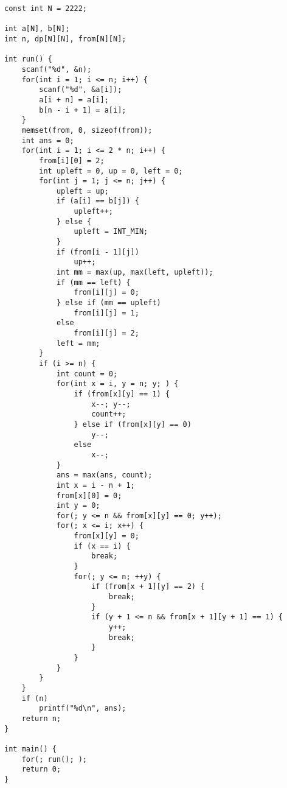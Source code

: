\begin{lstlisting}
const int N = 2222;

int a[N], b[N];
int n, dp[N][N], from[N][N];

int run() {
	scanf("%d", &n);
	for(int i = 1; i <= n; i++) {
		scanf("%d", &a[i]);
		a[i + n] = a[i];
		b[n - i + 1] = a[i];
	}
	memset(from, 0, sizeof(from));
	int ans = 0;
	for(int i = 1; i <= 2 * n; i++) {
		from[i][0] = 2;
		int upleft = 0, up = 0, left = 0;
		for(int j = 1; j <= n; j++) {
			upleft = up;
			if (a[i] == b[j]) {
				upleft++;
			} else {
				upleft = INT_MIN;
			}
			if (from[i - 1][j])
				up++;
			int mm = max(up, max(left, upleft));
			if (mm == left) {
				from[i][j] = 0;
			} else if (mm == upleft)
				from[i][j] = 1;
			else
				from[i][j] = 2;
			left = mm;
		}
		if (i >= n) {
			int count = 0;
			for(int x = i, y = n; y; ) {
				if (from[x][y] == 1) {
					x--; y--;
					count++;
				} else if (from[x][y] == 0)
					y--;
				else
					x--;
			}
			ans = max(ans, count);
			int x = i - n + 1;
			from[x][0] = 0;
			int y = 0;
			for(; y <= n && from[x][y] == 0; y++);
			for(; x <= i; x++) {
				from[x][y] = 0;
				if (x == i) {
					break;
				}
				for(; y <= n; ++y) {
					if (from[x + 1][y] == 2) {
						break;
					}
					if (y + 1 <= n && from[x + 1][y + 1] == 1) {
						y++;
						break;
					}
				}
			}
		}
	}
	if (n)
		printf("%d\n", ans);
	return n;
}

int main() {
	for(; run(); );
	return 0;
} 
	\end{lstlisting}
